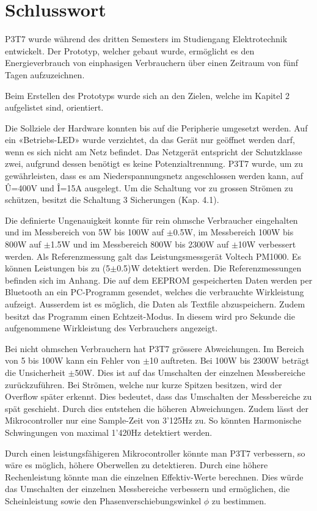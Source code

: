 \pagebreak
\section{Schlusswort}%
P3T7 wurde während des dritten Semesters im Studiengang Elektrotechnik entwickelt. Der Prototyp, welcher gebaut wurde, ermöglicht es den Energieverbrauch von einphasigen Verbrauchern über einen Zeitraum von fünf Tagen aufzuzeichnen.  
 
Beim Erstellen des Prototyps wurde sich an den Zielen, welche im Kapitel 2 aufgelistet sind, orientiert.  
 
Die Sollziele der Hardware konnten bis auf die Peripherie umgesetzt werden. Auf ein «Betriebs-LED» wurde verzichtet, da das Gerät nur geöffnet werden darf, wenn es sich nicht am Netz befindet. Das Netzgerät entspricht der Schutzklasse zwei, aufgrund dessen benötigt es keine Potenzialtrennung. P3T7 wurde, um zu gewährleisten, dass es am Niederspannungsnetz angeschlossen werden kann, auf \^U=400V und \^I=15A ausgelegt. Um die Schaltung vor zu grossen Strömen zu schützen, besitzt die Schaltung 3 Sicherungen (Kap. 4.1).   
 
Die definierte Ungenauigkeit konnte für rein ohmsche Verbraucher eingehalten und im Messbereich von 5W bis 100W auf $\pm$0.5W, im Messbereich 100W bis 800W auf $\pm$1.5W und im Messbereich 800W bis 2300W auf $\pm$10W verbessert werden. Als Referenzmessung galt das Leistungsmessgerät Voltech PM1000. Es können Leistungen bis zu (5$\pm$0.5)W detektiert werden. Die Referenzmessungen befinden sich im Anhang. Die auf dem EEPROM gespeicherten Daten werden per Bluetooth an ein PC-Programm gesendet, welches die verbrauchte Wirkleistung aufzeigt. Ausserdem ist es möglich, die Daten als Textfile abzuspeichern. Zudem besitzt das Programm einen Echtzeit-Modus. In diesem wird pro Sekunde die aufgenommene Wirkleistung des Verbrauchers angezeigt.   
 
Bei nicht ohmschen Verbrauchern hat P3T7 grössere Abweichungen. Im Bereich von 5 bis 100W kann ein Fehler von $\pm$10 auftreten. Bei 100W bis 2300W beträgt die Unsicherheit $\pm$50W. Dies ist auf das Umschalten der einzelnen Messbereiche zurückzuführen. Bei Strömen, welche nur kurze Spitzen besitzen, wird der Overflow später erkennt. Dies bedeutet, dass das Umschalten der Messbereiche zu spät geschieht. Durch dies entstehen die höheren Abweichungen. Zudem lässt der Mikrocontroller nur eine Sample-Zeit von 3’125Hz zu. So könnten Harmonische Schwingungen von maximal 1’420Hz detektiert werden.  
 
Durch einen leistungsfähigeren Mikrocontroller könnte man P3T7 verbessern, so wäre es möglich, höhere Oberwellen zu detektieren. Durch eine höhere Rechenleistung könnte man die einzelnen Effektiv-Werte berechnen. Dies würde das Umschalten der einzelnen Messbereiche verbessern und ermöglichen, die Scheinleistung sowie den Phasenverschiebungswinkel $\phi$ zu bestimmen. 
